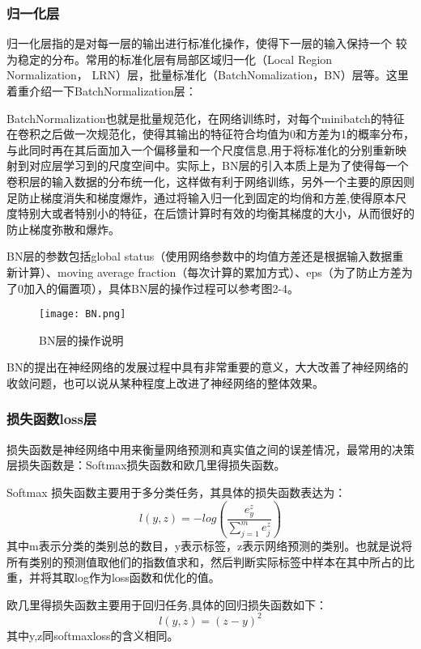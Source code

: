 \subsubsection{归一化层}
归一化层指的是对每一层的输出进行标准化操作，使得下一层的输入保持一个 较为稳定的分布。常用的标准化层有局部区域归一化（Local Region Normalization， LRN）层，批量标准化（BatchNomalization，BN）\cite{BATCHNORM}层等。这里着重介绍一下BatchNormalization层：

BatchNormalization也就是批量规范化，在网络训练时，对每个minibatch的特征在卷积之后做一次规范化，使得其输出的特征符合均值为0和方差为1的概率分布，与此同时再在其后面加入一个偏移量和一个尺度信息,用于将标准化的分别重新映射到对应层学习到的尺度空间中。实际上，BN层的引入本质上是为了使得每一个卷积层的输入数据的分布统一化，这样做有利于网络训练，另外一个主要的原因则足防止梯度消失和梯度爆炸，通过将输入归一化到固定的均俏和方差,使得原本尺度特别大或者特别小的特征，在后馈计算时有效的均衡其梯度的大小，从而很好的防止梯度弥散和爆炸。

BN层的参数包括global status（使用网络参数中的均值方差还是根据输入数据重新计算）、moving average fraction（每次计算的累加方式）、eps（为了防止方差为了0加入的偏置项），具体BN层的操作过程可以参考图2-4。
\begin{figure}[!ht]
 \centering
	\texttt{[image: BN.png]}
	\caption{BN层的操作说明}
\end{figure}

BN的提出在神经网络的发展过程中具有非常重要的意义，大大改善了神经网络的收敛问题，也可以说从某种程度上改进了神经网络的整体效果。
\subsubsection{损失函数loss层}
损失函数是神经网络中用来衡量网络预测和真实值之间的误差情况，最常用的决策层损失函数是：Softmax损失函数和欧几里得损失函数。

Softmax 损失函数主要用于多分类任务，其具体的损失函数表达为：
\begin{equation}{
l(y,z)=-log\left (  \frac{e^z_y}{\sum_{j=1}^{m} e^z_j} \right )
}
\end{equation}
其中m表示分类的类别总的数目，y表示标签，z表示网络预测的类别。也就是说将所有类别的预测值取他们的指数值求和，然后判断实际标签中样本在其中所占的比重，并将其取log作为loss函数和优化的值。

欧几里得损失函数主要用于回归任务,具体的回归损失函数如下：
\begin{equation}{
l(y,z)=(z-y)^2
}
\end{equation}
其中y,z同softmaxloss的含义相同。

